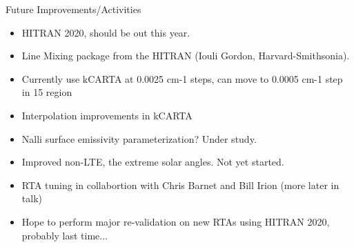 \documentclass[10pt,t]{beamer}
\begin{document}
\begin{frame}{Future Improvements/Activities}

  \begin{itemize}
  \item HITRAN 2020, should be out this year.
  \item Line Mixing package from the HITRAN (Iouli Gordon, Harvard-Smithsonia).
  \item Currently use kCARTA at 0.0025 cm-1 steps, can move to 0.0005 cm-1 step in 15 \um region
  \item Interpolation improvements in kCARTA
  \item Nalli surface emissivity parameterization?  Under study.
  \item Improved non-LTE, the extreme solar angles.  Not yet started.
  \item RTA tuning in collabortion with Chris Barnet and Bill Irion (more later in talk)
  \item Hope to perform major re-validation on new RTAs using HITRAN 2020, probably last time...
  \end{itemize}
\end{frame}
\end{document}
